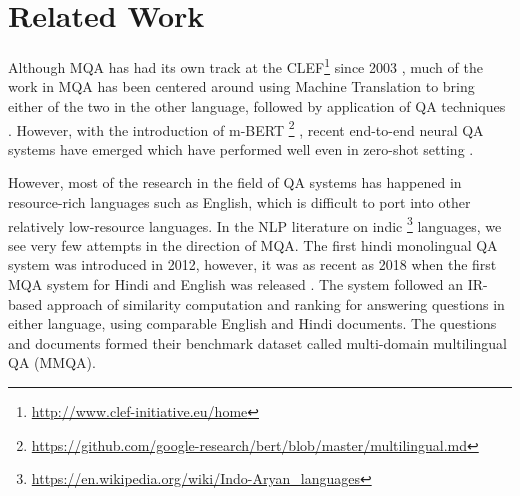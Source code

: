 \documentclass[acmsmall]{acmart}
\begin{document}
\section{Related Work}
\label{related_work}
\par Although MQA has had its own track at the CLEF\footnote{\url{http://www.clef-initiative.eu/home}} since 2003 \cite{multilingual-trec}, much of the work in MQA has been centered around using Machine Translation to bring either of the two in the other language, followed by application of QA techniques \cite{translate}. However, with the introduction of m-BERT \footnote{\label{mbert}\url{https://github.com/google-research/bert/blob/master/multilingual.md}} \cite{bert}, recent end-to-end neural QA systems have emerged \cite{multilingualQA} which have performed well even in zero-shot setting \cite{bert-multilingual}. 

\par However, most of the research in the field of QA systems has happened in resource-rich languages such as English, which is difficult to port into other relatively low-resource languages. In the NLP literature on indic \footnote{\url{https://en.wikipedia.org/wiki/Indo-Aryan\_languages}} languages, we see very few attempts in the direction of MQA. The first hindi monolingual QA system \cite{prashnottar} was introduced in 2012, however, it was as recent as 2018 when the first MQA system for Hindi and English was released \cite{mmqa}. The system followed an IR-based approach of similarity computation and ranking for answering questions in either language, using comparable English and Hindi documents. The questions and documents formed their benchmark dataset called multi-domain multilingual QA (MMQA). 
\end{document}
